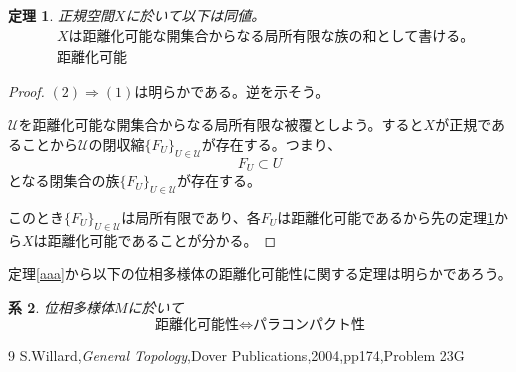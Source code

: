 \documentclass[leqno]{jsarticle}
\newtheorem{thm}{定理}
\newtheorem{prop}[thm]{命題}
\newtheorem{cor}[thm]{系}
\newcommand{\To}{\Longrightarrow}
\newcommand{\dpst}{\displaystyle}
\newcommand{\uu}{\mathcal{U}}
\newcommand{\F}{\mathcal{F}}
\begin{document}
\setcounter{equation}{0}
\begin{thm}\label{asd}
正規空間$X$に於いて以下は同値。
\begin{align}
&\mbox{$X$は距離化可能な開集合からなる局所有限な族の和として書ける。}\\
&\mbox{距離化可能}
\end{align}
\end{thm}
\begin{proof}
$(2)\To(1)$は明らかである。逆を示そう。\par
$\uu$を距離化可能な開集合からなる局所有限な被覆としよう。すると$X$が正規であることから$\uu$の閉収縮$\{F_U\}_{U\in \uu}$が存在する。つまり、
\[
F_U\subset U
\]
となる閉集合の族$\{F_U\}_{U\in \uu}$が存在する。\par 
このとき$\{F_U\}_{U\in \uu}$は局所有限であり、各$F_U$は距離化可能であるから先の定理\ref{asd}から$X$は距離化可能であることが分かる。
\end{proof}

定理\ref{aaa}から以下の位相多様体の距離化可能性に関する定理は明らかであろう。
\begin{cor}
位相多様体$M$に於いて
\[
\mbox{距離化可能性$\iff$パラコンパクト性}
\]
\end{cor}

	
\begin{thebibliography}{9}
S.Willard,{\it General Topology},Dover Publications,2004,pp174,Problem 23G
\end{thebibliography}




			
\end{document}
